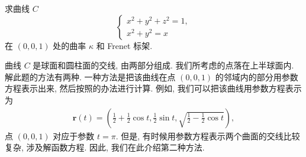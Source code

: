 \documentclass[../../main.tex]{subfiles}%
\begin{document}
\begin{example}
求曲线 $C$
\[
\begin{cases}
x^2 + y^2 + z^2 = 1, \\
x^2 + y^2 = x
\end{cases}
\]
在 $(0,0,1)$ 处的曲率 $\kappa$ 和 Frenet 标架.
\end{example}
\begin{remark}
曲线 $C$ 是球面和圆柱面的交线, 由两部分组成. 我们所考虑的点落在上半球面内. 解此题的方法有两种. 一种方法是把该曲线在点 $(0,0,1)$ 的邻域内的部分用参数方程表示出来, 然后按照的办法进行计算. 例如, 我们可以把该曲线用参数方程表示为
\begin{align*}
\bm{r}(t) = \left(\frac{1}{2} + \frac{1}{2}\cos t, \frac{1}{2}\sin t, \sqrt{\frac{1}{2} - \frac{1}{2}\cos t}\right),
\end{align*}
点 $(0,0,1)$ 对应于参数 $t = \pi$. 但是, 有时候用参数方程表示两个曲面的交线比较复杂, 涉及解函数方程. 因此, 我们在此介绍第二种方法.
\end{remark}
\end{document}
